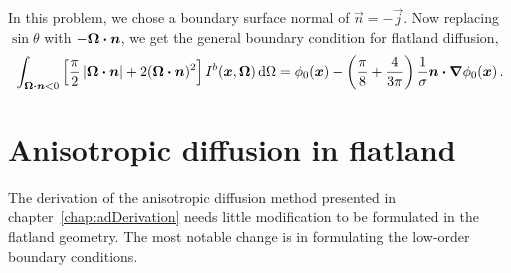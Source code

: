 In this problem, we chose a boundary surface normal of $\vec{n}=-\vec{j}$. Now
replacing $\sin \theta$ with $-\bm{\Omega}\bm{\cdot}\bm{n}$, we get the general
boundary condition for flatland diffusion,
\begin{equation} \label{eq:flatlandDiffusionVarBc}
\int_{\bm{\Omega}\bm{\cdot}\bm{n} < 0} \left[ \frac{\pi}{2}
\left| \bm{\Omega}\bm{\cdot}\bm{n} \right| + 2 (\bm{\Omega}\bm{\cdot}\bm{n})^2 \right]
I^b(\bm{x}, \bm{\Omega}) \mathop{}\!\mathrm{d}\Omega
= 
  \phi_0(\bm{x})
  - \left( \frac{\pi}{8} + \frac{4}{3\pi} \right) \frac{1}{\sigma}
  \bm{n}\bm{\cdot}\bm{\nabla} \phi_0(\bm{x})\,.
\end{equation}


\section{Anisotropic diffusion in flatland}
The derivation of the anisotropic diffusion method presented in
chapter~\ref{chap:adDerivation} needs little modification to be formulated
in the flatland geometry. The most notable change is in formulating the
low-order boundary conditions.

